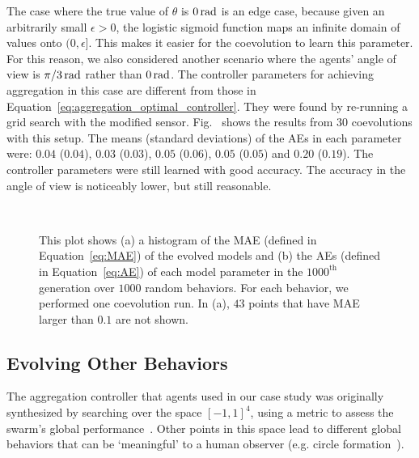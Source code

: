 The case where the true value of $\theta$ is $\unit[0]{rad}$ is an edge case, because given an arbitrarily small $\epsilon>0$, the logistic sigmoid function maps an infinite domain of values onto $(0,\epsilon]$. 
This makes it easier for the coevolution to learn this parameter. For this reason, we also considered another scenario where the agents' angle of view is $\unit[\pi/3]{rad}$ rather than $\unit[0]{rad}$. The controller parameters for achieving aggregation in this case are different from those in Equation~\eqref{eq:aggregation_optimal_controller}. They were found by re-running a grid search with the modified sensor. Fig.~ shows the results from $30$ coevolutions with this setup. The means (standard deviations) of the AEs in each parameter were: $0.04$ ($0.04$), $0.03$ ($0.03$), $0.05$ ($0.06$), $0.05$ ($0.05$) and $0.20$ ($0.19$). The controller parameters were still learned with good accuracy. The accuracy in the angle of view is noticeably lower, but still reasonable.

\begin{figure}[!t]%
	\centering
		\\
		\caption{This plot shows (a) a histogram of the MAE (defined in Equation~\eqref{eq:MAE}) of the evolved models and (b) the AEs (defined in Equation~\eqref{eq:AE}) of each model parameter in the $1000^\textrm{th}$ generation over $1000$ random behaviors. For each behavior, we performed one coevolution run. In (a), $43$ points that have MAE larger than $0.1$ are not shown.}
		\label{fig:model_parameters_random_controllers}
\end{figure}

\subsection{Evolving Other Behaviors}\label{sec:evolving_other_behaviors_swarm_simulation}
The aggregation controller that agents used in our case study was originally synthesized by searching over the space $\left[-1,1\right]^4$, using a metric to assess the swarm's global performance~\cite{Gauci2014_ijrr}. Other points in this space lead to different global behaviors that can be `meaningful' to a human observer (e.g. circle formation~\cite{Melvin_DARS2014}). 

